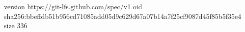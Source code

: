 version https://git-lfs.github.com/spec/v1
oid sha256:bbeffdb51b956cd71085add05d9c629d67a07b14a7f25cf9087d45f85b5f35e4
size 336
